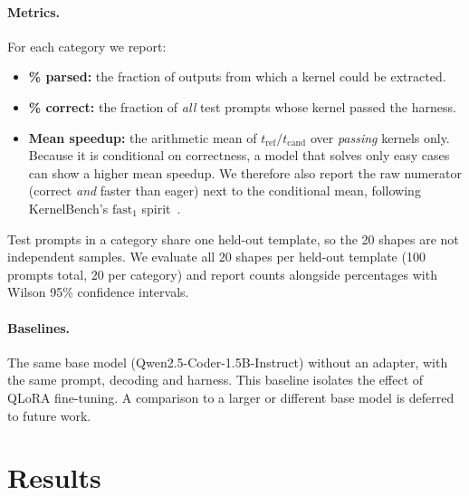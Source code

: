 \documentclass[11pt]{article}
\begin{document}
\paragraph{Metrics.} For each category we report:
\begin{itemize}
  \item \textbf{\% parsed:} the fraction of outputs from which a kernel could be extracted.
  \item \textbf{\% correct:} the fraction of \emph{all} test prompts whose kernel passed the harness.
  \item \textbf{Mean speedup:} the arithmetic mean of $t_{\mathrm{ref}}/t_{\mathrm{cand}}$ over
        \emph{passing} kernels only. %
        Because it is conditional on correctness, a model that solves only easy cases can show a
        higher mean speedup. We therefore also report the raw numerator (correct \emph{and}
        faster than eager) next to the conditional mean, following KernelBench's $\mathrm{fast}_1$
        spirit~\cite{ouyang2025kernelbench}.
\end{itemize}
Test prompts in a category share one held-out template, so the 20 shapes are not independent
samples. We evaluate all 20 shapes per held-out template (100 prompts total, 20 per category)
and report counts alongside percentages with Wilson 95\% confidence intervals.

\paragraph{Baselines.} The same base model (Qwen2.5-Coder-1.5B-Instruct) without an adapter,
with the same prompt, decoding and harness. %
This baseline isolates the effect of QLoRA fine-tuning. A comparison to a larger or different base
model is deferred to future work.

\section{Results}
\label{sec:results}

\end{document}
